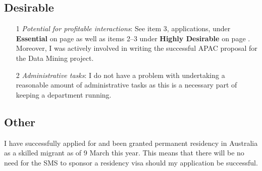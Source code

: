 \documentclass[12pt,a4paper]{article}
\begin{document}
\subsection*{Desirable}

\begin{itemize} 
  \item[1] \textit{Potential for profitable interactions}: See
  item 3, applications, under \textbf{Essential} on 
  page \pageref{ref:PE} as well as items 2--3 under
  \textbf{Highly Desirable} on page \pageref{ref:Tim}.
  Moreover, I was actively involved in writing the successful APAC 
  proposal for the Data Mining project. 
  \item[2] \textit{Administrative tasks}: 
  I do not have a problem with undertaking a reasonable amount
  of administrative tasks as this is a necessary part of keeping a department
  running.
\end{itemize} 
  
\subsection*{Other}
  I have successfully applied for and been granted permanent
  residency in Australia as a skilled migrant as of 9 March this year. 
  This means that there will be no need for the SMS to sponsor 
  a residency visa should my application be successful. 
\end{document}
